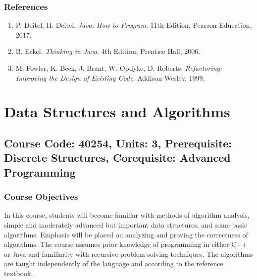 \documentclass[12pt]{article}
\begin{document}
\subsubsection*{References}
\begin{enumerate}
    \item P. Deitel, H. Deitel. \textit{Java: How to Program}. 11th Edition, Pearson Education, 2017.
    \item B. Eckel. \textit{Thinking in Java}. 4th Edition, Prentice Hall, 2006.
    \item M. Fowler, K. Beck, J. Brant, W. Opdyke, D. Roberts. \textit{Refactoring: Improving the Design of Existing Code}. Addison-Wesley, 1999.
\end{enumerate}

\newpage

\section{Data Structures and Algorithms}
\subsection*{Course Code: 40254, Units: 3, Prerequisite: Discrete Structures, Corequisite: Advanced Programming}

\subsubsection*{Course Objectives}
In this course, students will become familiar with methods of algorithm analysis, simple and moderately advanced but important data structures, and some basic algorithms. Emphasis will be placed on analyzing and proving the correctness of algorithms. The course assumes prior knowledge of programming in either C++ or Java and familiarity with recursive problem-solving techniques. The algorithms are taught independently of the language and according to the reference textbook.
\end{document}
